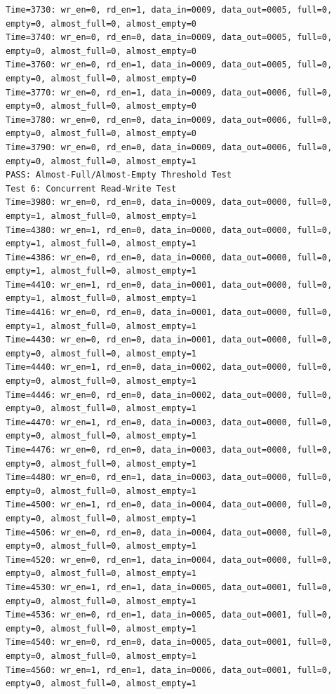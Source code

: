 \documentclass[UTF8]{ctexart}
\begin{document}
\begin{lstlisting}[frame=shadowbox]
Time=3730: wr_en=0, rd_en=1, data_in=0009, data_out=0005, full=0, empty=0, almost_full=0, almost_empty=0
Time=3740: wr_en=0, rd_en=0, data_in=0009, data_out=0005, full=0, empty=0, almost_full=0, almost_empty=0
Time=3760: wr_en=0, rd_en=1, data_in=0009, data_out=0005, full=0, empty=0, almost_full=0, almost_empty=0
Time=3770: wr_en=0, rd_en=1, data_in=0009, data_out=0006, full=0, empty=0, almost_full=0, almost_empty=0
Time=3780: wr_en=0, rd_en=0, data_in=0009, data_out=0006, full=0, empty=0, almost_full=0, almost_empty=0
Time=3790: wr_en=0, rd_en=0, data_in=0009, data_out=0006, full=0, empty=0, almost_full=0, almost_empty=1
PASS: Almost-Full/Almost-Empty Threshold Test
Test 6: Concurrent Read-Write Test
Time=3980: wr_en=0, rd_en=0, data_in=0009, data_out=0000, full=0, empty=1, almost_full=0, almost_empty=1
Time=4380: wr_en=1, rd_en=0, data_in=0000, data_out=0000, full=0, empty=1, almost_full=0, almost_empty=1
Time=4386: wr_en=0, rd_en=0, data_in=0000, data_out=0000, full=0, empty=1, almost_full=0, almost_empty=1
Time=4410: wr_en=1, rd_en=0, data_in=0001, data_out=0000, full=0, empty=1, almost_full=0, almost_empty=1
Time=4416: wr_en=0, rd_en=0, data_in=0001, data_out=0000, full=0, empty=1, almost_full=0, almost_empty=1
Time=4430: wr_en=0, rd_en=0, data_in=0001, data_out=0000, full=0, empty=0, almost_full=0, almost_empty=1
Time=4440: wr_en=1, rd_en=0, data_in=0002, data_out=0000, full=0, empty=0, almost_full=0, almost_empty=1
Time=4446: wr_en=0, rd_en=0, data_in=0002, data_out=0000, full=0, empty=0, almost_full=0, almost_empty=1
Time=4470: wr_en=1, rd_en=0, data_in=0003, data_out=0000, full=0, empty=0, almost_full=0, almost_empty=1
Time=4476: wr_en=0, rd_en=0, data_in=0003, data_out=0000, full=0, empty=0, almost_full=0, almost_empty=1
Time=4480: wr_en=0, rd_en=1, data_in=0003, data_out=0000, full=0, empty=0, almost_full=0, almost_empty=1
Time=4500: wr_en=1, rd_en=0, data_in=0004, data_out=0000, full=0, empty=0, almost_full=0, almost_empty=1
Time=4506: wr_en=0, rd_en=0, data_in=0004, data_out=0000, full=0, empty=0, almost_full=0, almost_empty=1
Time=4520: wr_en=0, rd_en=1, data_in=0004, data_out=0000, full=0, empty=0, almost_full=0, almost_empty=1
Time=4530: wr_en=1, rd_en=1, data_in=0005, data_out=0001, full=0, empty=0, almost_full=0, almost_empty=1
Time=4536: wr_en=0, rd_en=1, data_in=0005, data_out=0001, full=0, empty=0, almost_full=0, almost_empty=1
Time=4540: wr_en=0, rd_en=0, data_in=0005, data_out=0001, full=0, empty=0, almost_full=0, almost_empty=1
Time=4560: wr_en=1, rd_en=1, data_in=0006, data_out=0001, full=0, empty=0, almost_full=0, almost_empty=1

\end{lstlisting}
\end{document}
